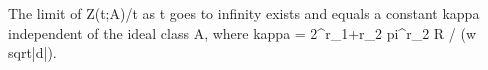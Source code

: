 The limit of Z(t;A)/t as t goes to infinity exists and equals a constant kappa independent of the ideal class A, where kappa = 2^{r_1+r_2} pi^{r_2} R / (w sqrt{|d|}).
